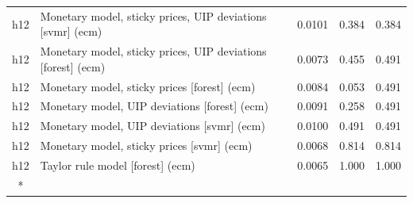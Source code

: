 \begin{ThreePartTable}
\begin{longtable}[t]{cp{5.5cm}ccc}
h12 & \raggedright Monetary model, sticky prices, UIP deviations [svmr] (ecm) & 0.0101 & 0.384 & 0.384\\
h12 & \raggedright Monetary model, sticky prices, UIP deviations [forest] (ecm) & 0.0073 & 0.455 & 0.491\\
h12 & \raggedright Monetary model, sticky prices [forest] (ecm) & 0.0084 & 0.053 & 0.491\\
h12 & \raggedright Monetary model, UIP deviations [forest] (ecm) & 0.0091 & 0.258 & 0.491\\
h12 & \raggedright Monetary model, UIP deviations [svmr] (ecm) & 0.0100 & 0.491 & 0.491\\
h12 & \raggedright Monetary model, sticky prices [svmr] (ecm) & 0.0068 & 0.814 & 0.814\\
h12 & \raggedright Taylor rule model [forest] (ecm) & 0.0065 & 1.000 & 1.000\\*
\end{longtable}
\end{ThreePartTable}
\endgroup{}

